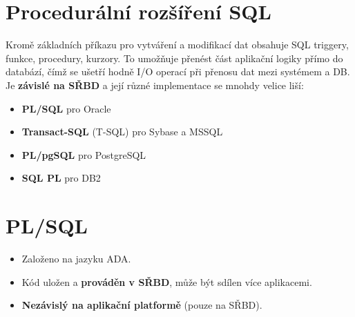 \section{Procedurální rozšíření SQL}
Kromě základních příkazu pro vytváření a modifikací dat obsahuje SQL triggery, funkce, procedury, kurzory. To umožňuje přenést část aplikační logiky přímo do databází, čímž se ušetří hodně I/O operací při přenosu dat mezi systémem a DB. Je \textbf{závislé na SŘBD} a její různé implementace se mnohdy velice liší:
\begin{itemize}
    \item \textbf{PL/SQL} pro Oracle
    \item \textbf{Transact-SQL} (T-SQL) pro Sybase a MSSQL
    \item \textbf{PL/pgSQL} pro PostgreSQL
    \item \textbf{SQL PL} pro DB2
\end{itemize}

\section{PL/SQL}
\begin{itemize}
    \item Založeno na jazyku ADA.
    \item Kód uložen a \textbf{prováděn v SŘBD}, může být sdílen více aplikacemi.
    \item \textbf{Nezávislý na aplikační platformě} (pouze na SŘBD).
\end{itemize}

